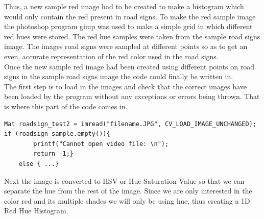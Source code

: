 \documentclass{article}
\begin{document}
Thus, a new sample red image had to be created to make a histogram which would only contain the red present in road signs. To make the red sample image  the photoshop program gimp was used to make a simple grid in which different red hues were stored. The red hue samples were taken from the sample road signs image. The images road signs were sampled at different points so as to get an even, accurate representation of the red color used in the road signs.\\
Once the new sample red image had been created using different points on road signs in the sample road signs image the code could finally be written in.\\
The first step is to load in the images and check that the correct images have been loaded by the program without any exceptions or errors being thrown. That is where this part of the code comes in.
\begin{lstlisting}
Mat roadsign_test2 = imread("filename.JPG", CV_LOAD_IMAGE_UNCHANGED);
if (roadsign_sample.empty()){
		printf("Cannot open video file: \n");
		return -1;}
	else { ...}
\end{lstlisting}
Next the image is converted to HSV or Hue Saturation Value so that we can separate the hue from the rest of the image. Since we are only interested in the color red and its multiple shades we will only be using hue, thus creating a 1D Red Hue Histogram.
\end{document}
